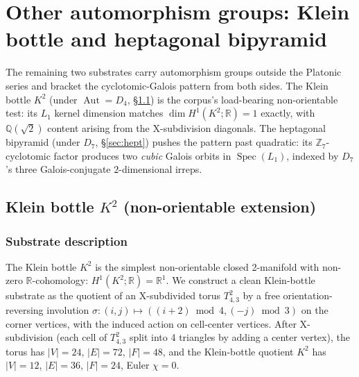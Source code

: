 \documentclass[12pt,a4paper]{article}
\theoremstyle{definition}
\theoremstyle{remark}
\newcommand{\bZ}{\mathbb{Z}}
\newcommand{\bR}{\mathbb{R}}
\newcommand{\bQ}{\mathbb{Q}}                %
\DeclareMathOperator{\Aut}{Aut}
\DeclareMathOperator{\Spec}{Spec}
\begin{document}
\section{Other automorphism groups: Klein bottle and
heptagonal bipyramid}\label{sec:dh-other}

The remaining two substrates carry automorphism groups outside the Platonic
series and bracket the cyclotomic-Galois pattern from both sides. The Klein
bottle $K^2$ (under $\Aut = D_4$, \S\ref{sec:klein}) is the corpus's
load-bearing non-orientable test: its $L_1$ kernel dimension matches
$\dim H^1(K^2;\bR) = 1$ exactly, with $\bQ(\sqrt 2)$ content arising from the
X-subdivision diagonals. The heptagonal bipyramid (under $D_7$,
\S\ref{sec:hept}) pushes the pattern past quadratic: its $\bZ_7$-cyclotomic
factor produces two \emph{cubic} Galois orbits in $\Spec(L_1)$, indexed by
$D_7$'s three Galois-conjugate $2$-dimensional irreps.

\subsection{Klein bottle $K^2$ (non-orientable extension)}\label{sec:klein}

\subsubsection{Substrate description}\label{sec:klein-description}

The Klein bottle $K^2$ is the simplest non-orientable closed
2-manifold with non-zero $\bR$-cohomology:
$H^1(K^2; \bR) = \bR^1$. We construct a clean Klein-bottle substrate
as the quotient of an X-subdivided torus $T^2_{4,3}$ by a free
orientation-reversing involution
$\sigma\colon (i, j) \mapsto ((i+2) \bmod 4, (-j) \bmod 3)$ on the
corner vertices, with the induced action on cell-center vertices.
After X-subdivision (each cell of $T^2_{4,3}$ split into 4 triangles
by adding a center vertex), the torus has $|V| = 24$, $|E| = 72$,
$|F| = 48$, and the Klein-bottle quotient $K^2$ has $|V| = 12$,
$|E| = 36$, $|F| = 24$, Euler $\chi = 0$.
\end{document}
